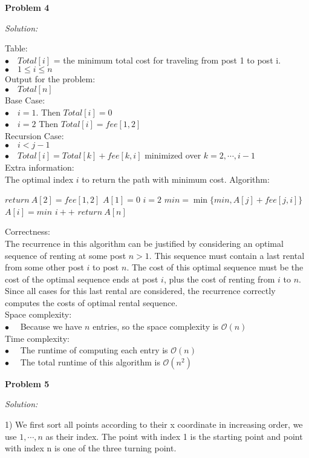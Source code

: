 \documentclass[12pt,letterpaper]{article}
\def\pp{\par\noindent}
\newcommand{\problem}[1]{ \bigskip \pp \textbf{Problem #1}\par}
\newcommand{\solution}{\textit{Solution:}\par}
\begin{document}
\problem{4}
\solution
Table: \\
$\bullet \quad Total[i]$ = the minimum total cost for traveling from post 1 to post i. \\
$\bullet \quad 1 \le i \le n$ \\
Output for the problem: \\
$\bullet \quad Total[n]$ \\
Base Case: \\
$\bullet \quad i = 1 $. Then $Total[i] = 0 $  \\
$\bullet \quad i = 2 $ Then $Total[i] = fee[1,2]$ \\
Recursion Case: \\
$\bullet \quad i < j - 1$ \\
$\bullet \quad Total[i] = Total[k] + fee[k,i]$ minimized over $ k = 2,\cdots,i-1$ \\
Extra information: \\
The optimal index $ i $ to return the path with minimum cost.
Algorithm: \\
\begin{algorithm}[H]
 {
	$return\  A[2] = fee[1,2]$ \;
}
$A[1] = 0$\;
$ i = 2 $\;
{
  {
 $min = \min \{min,A[j] + fee[j,i] \}$\;
 }
$A[i] = min $\;
$ i ++ $\;
}
   $return\  A[n]$ \;
\end{algorithm}
Correctness: \\
The recurrence in this algorithm can be justified by considering an optimal sequence of renting at some post $ n > 1$. This sequence must contain a last rental from some other post $i$ to post $n$. The cost of this optimal sequence must be the cost of the optimal sequence ends at post $i$, plus the cost of renting from $i$ to $n$. Since all cases for this last rental are considered, the recurrence correctly computes the costs of optimal rental sequence. \\
Space complexity: \\
$\bullet \quad$ Because we have $ n $ entries, so the space complexity is $\mathcal{O}(n)$ \\
Time complexity: \\
$\bullet \quad$ The runtime of computing each entry is $\mathcal{O}(n)$ \\
$\bullet \quad$ The total runtime of this algorithm is $\mathcal{O}(n^2)$ \\

\problem{5}
\solution
1) We first sort all points according to their x coordinate in increasing order, we use $1,\cdots,n$ as their index. The point with index 1 is the starting point and point with index n is one of the three turning point. \\
\end{document}
